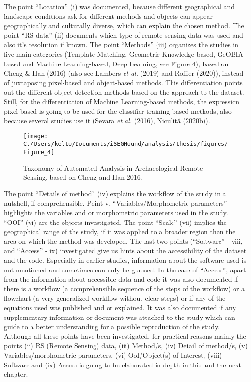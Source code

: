 \documentclass[
  12pt,
]{article}
\begin{document}
The point ``Location'' (i) was documented, because different geographical and landscape conditions ask for different methods and objects can appear geographically and culturally diverse, which can explain the chosen method. The point ``RS data'' (ii) documents which type of remote sensing data was used and also it's resolution if known. The point ``Methods'' (iii) organizes the studies in five main categories (Template Matching, Geometric Knowledge-based, GeOBIA-based and Machine Learning-based, Deep Learning; see Figure 4), based on Cheng \& Han (2016) (also see Lambers \emph{et al.} (2019) and Roffler (2020)), instead of juxtaposing pixel-based and object-based methods. This differentiation points out the different object detection methods based on the approach to the dataset. Still, for the differentiation of Machine Learning-based methods, the expression pixel-based is going to be used for the classifier training-based methods, also because several studies use it (Sevara \emph{et al.} (2016), Niculiță (2020b)).

\begin{figure}

{\centering \texttt{[image: C:/Users/kelto/Documents/iSEGMound/analysis/thesis/figures/Figure\_4]} 

}

\caption{Taxonomy of Automated Analysis in Archaeological Remote Sensing, based on Cheng and Han 2016.}\label{fig:Figure4}
\end{figure}

The point ``Details of method'' (iv) explains the workflow of the study in a nutshell, if comprehensible. Point v, ``Variables/Morphometric parameters'' highlights the variables and or morphometric parameters used in the study. ``OOI'' (vi) are the objects investigated. The point ``Scale'' (vii) implies the geographical range of the study, if it was applied to a broader region than the area on which the method was developed. The last two points (``Software'' - viii, and ``Access'' - ix) investigated give us hints about the accessibility of the dataset and the code. Especially in earlier studies, information about the software used is not mentioned and sometimes can only be guessed. In the case of ``Access'', apart from the information about accessible data and code it was also documented if there is a workflow (a comprehensible sequence of the steps of the workflow) or a flowchart (a very generalized workflow without clear steps) or if any of the equations used was published and or explained. It was also documented if any supplementary information or document was attached to the study which can guide to a better understanding for a possible reproduction of the study. Although all these points have been investigated, for practical reasons mainly the points (ii) RS (Remote Sensing) data, (iii) Method/s, (iv) Detail of method/s, (v) Variables/morphometric parameters, (vi) OoI/Object(s) of Interest, (viii) Software and (ix) Access is going to be elaborated in depth in this and the next chapter.
\end{document}

